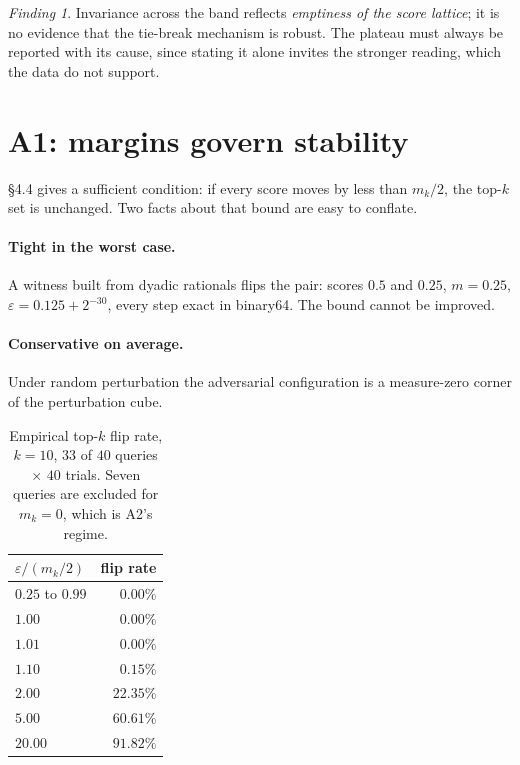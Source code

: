 \documentclass[11pt,a4paper]{article}
\theoremstyle{plain} \newtheorem{proposition}{Proposition} \theoremstyle{remark}
\newtheorem{finding}{Finding}
\begin{document}
\begin{finding}\label{find:plateau}
Invariance across the band reflects \emph{emptiness of the score lattice}; it is
no evidence that the tie-break mechanism is robust. The plateau must always be
reported with its cause, since stating it alone invites the stronger reading,
which the data do not support.
\end{finding}

\section{A1: margins govern stability}

\S4.4 gives a sufficient condition: if every score moves by less than $m_k/2$,
the top-$k$ set is unchanged. Two facts about that bound are easy to conflate.

\paragraph{Tight in the worst case.} A witness built from dyadic rationals flips
the pair: scores $0.5$ and $0.25$, $m = 0.25$, $\varepsilon = 0.125 + 2^{-30}$,
every step exact in binary64. The bound cannot be improved.

\paragraph{Conservative on average.} Under random perturbation the adversarial
configuration is a measure-zero corner of the perturbation cube.

\begin{table}[ht]\centering
\caption{Empirical top-$k$ flip rate, $k=10$, $33$ of $40$ queries $\times$ $40$
trials. Seven queries are excluded for $m_k = 0$, which is A2's regime.}
\label{tab:transition}
\begin{tabular}{lr}
\toprule
$\varepsilon / (m_k/2)$ & flip rate \\
\midrule
$0.25$ to $0.99$        & $0.00\%$ \\
$1.00$                  & $0.00\%$ \\
$1.01$                  & $0.00\%$ \\
$1.10$                  & $0.15\%$ \\
$2.00$                  & $22.35\%$ \\
$5.00$                  & $60.61\%$ \\
$20.00$                 & $91.82\%$ \\
\bottomrule
\end{tabular}
\end{table}
\end{document}
